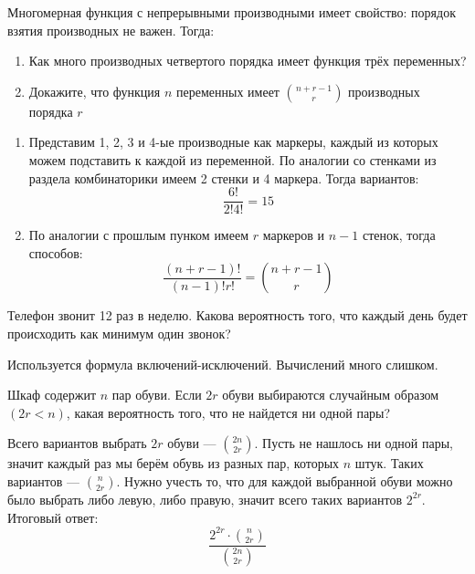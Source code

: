 \documentclass[document]{subfiles}
\begin{document}
\begin{problem}
    Многомерная функция с непрерывными производными имеет свойство: порядок взятия производных не важен. Тогда:
    \begin{enumerate}
        \item Как много производных четвертого порядка имеет функция трёх переменных?
        \item Докажите, что функция $n$ переменных имеет $\binom{n+r-1}{r}$ производных порядка $r$
    \end{enumerate}
\end{problem}
\begin{solution}
    \begin{enumerate}
        \item Представим 1, 2, 3 и 4-ые производные как маркеры, каждый из которых можем подставить к каждой из переменной. По аналогии со стенками из раздела комбинаторики имеем 2 стенки и 4 маркера. Тогда вариантов:
        \[\frac{6!}{2!4!} = 15\]
        \item По аналогии с прошлым пунком имеем $r$ маркеров и $n - 1$ стенок, тогда способов:
            \[\frac{(n + r - 1)!}{(n-1)! r!} = \binom{n + r - 1}{r}\]
    \end{enumerate}
\end{solution}

\begin{problem}
    Телефон звонит 12 раз в неделю. Какова вероятность того, что каждый день будет происходить как минимум один звонок?
\end{problem}
\begin{solution}
    Используется формула включений-исключений. Вычислений много слишком.
\end{solution}

\begin{problem}
    Шкаф содержит $n$ пар обуви. Если $2r$ обуви выбираются случайным образом $(2r < n)$, какая вероятность того, что не найдется ни одной пары?
\end{problem}
\begin{solution}
    Всего вариантов выбрать $2r$ обуви --- $\binom{2n}{2r}$. Пусть не нашлось ни одной пары, значит каждый раз мы берём обувь из разных пар, которых $n$ штук. Таких вариантов --- $\binom{n}{2r}$. Нужно учесть то, что для каждой выбранной обуви можно было выбрать либо левую, либо правую, значит всего таких вариантов $2^{2r}$. Итоговый ответ:
    \[\frac{2^{2r} \cdot \binom{n}{2r}}{\binom{2n}{2r}}\]
\end{solution}
\end{document}
